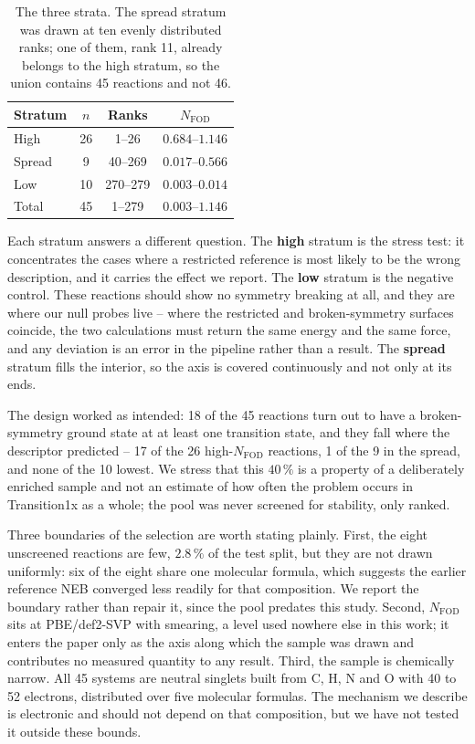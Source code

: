 \begin{table}[t]
  \centering
  \begin{tabular}{lccc}
    \toprule
    Stratum & $n$ & Ranks & $N_\mathrm{FOD}$ \\
    \midrule
    High         & 26 & 1--26     & $0.684$--$1.146$ \\
    Spread       &  9 & 40--269   & $0.017$--$0.566$ \\
    Low          & 10 & 270--279  & $0.003$--$0.014$ \\
    \midrule
    Total        & 45 & 1--279    & $0.003$--$1.146$ \\
    \bottomrule
  \end{tabular}
  \caption{The three strata. The spread stratum was drawn at ten evenly
  distributed ranks; one of them, rank 11, already belongs to the high
  stratum, so the union contains 45 reactions and not 46.}
  \label{tab:strata}
\end{table}

Each stratum answers a different question. The \textbf{high} stratum is the stress
test: it concentrates the cases where a restricted reference is most likely to
be the wrong description, and it carries the effect we report. The \textbf{low}
stratum is the negative control. These reactions should show no symmetry
breaking at all, and they are where our null probes live -- where the
restricted and broken-symmetry surfaces coincide, the two calculations must
return the same energy and the same force, and any deviation is an error in the
pipeline rather than a result. The \textbf{spread} stratum fills the interior, so
the axis is covered continuously and not only at its ends.

The design worked as intended: 18 of the 45 reactions turn out to have a
broken-symmetry ground state at at least one transition state, and they fall
where the descriptor predicted -- 17 of the 26 high-$N_\mathrm{FOD}$
reactions, 1 of the 9 in the spread, and none of the 10 lowest. We stress that
this $40\,\%$ is a property of a deliberately enriched sample and not an
estimate of how often the problem occurs in Transition1x as a whole; the pool
was never screened for stability, only ranked.

Three boundaries of the selection are worth stating plainly. First, the eight
unscreened reactions are few, $2.8\,\%$ of the test split, but they are not
drawn uniformly: six of the eight share one molecular formula, which suggests
the earlier reference NEB converged less readily for that composition. We
report the boundary rather than repair it, since the pool predates this study.
Second,
$N_\mathrm{FOD}$ sits at PBE/def2-SVP with smearing, a level used nowhere else
in this work; it enters the paper only as the axis along which the sample was
drawn and contributes no measured quantity to any result. Third, the sample is
chemically narrow. All 45 systems are neutral singlets built from C, H, N and O
with 40 to 52 electrons, distributed over five molecular formulas. The
mechanism we describe is electronic and should not depend on that composition,
but we have not tested it outside these bounds.
